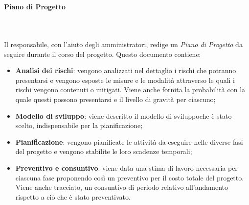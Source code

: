 		\paragraph{Piano di Progetto} \mbox{}\\ \mbox{}\\
		Il responsabile, con l'aiuto degli amministratori, redige un \textit{Piano di Progetto} da seguire durante il corso del progetto. Questo documento contiene:
		\begin{itemize}
			\item \textbf{Analisi dei rischi}: vengono analizzati nel dettaglio i rischi che potranno presentarsi e vengono esposte le misure e le modalità attraverso le quali i rischi vengono contenuti o mitigati. Viene anche fornita la probabilità con la quale questi possono presentarsi e il livello di gravità per ciascuno;
			\item \textbf{Modello di sviluppo}: viene descritto il modello di sviluppo\glosp che è stato scelto, indispensabile per la pianificazione;
			\item \textbf{Pianificazione}: vengono pianificate le attività da eseguire nelle diverse fasi del progetto e vengono stabilite le loro scadenze temporali;
			\item \textbf{Preventivo e consuntivo}: viene data una stima di lavoro necessaria per ciascuna fase proponendo così un preventivo per il costo totale del progetto. Viene anche tracciato, un consuntivo di periodo relativo all'andamento rispetto a ciò che è stato preventivato.
		\end{itemize}
